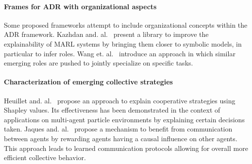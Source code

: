 \documentclass{ecai}
\begin{document}
\paragraph{\textbf{Frames for ADR with organizational aspects}}
%
Some proposed frameworks attempt to include organizational concepts within the ADR framework.
Kazhdan and. al.~\cite{Kazhdan2020} present a library to improve the explainability of MARL systems by bringing them closer to symbolic models, in particular to infer roles.%
%
Wang et. al.~\cite{Wang2020} introduce an approach in which similar emerging roles are pushed to jointly specialize on specific tasks.
%
%

\paragraph{\textbf{Characterization of emerging collective strategies}}
%
Heuillet and. al.~\cite{Heuillet2022} propose an approach to explain cooperative strategies using Shapley values. Its effectiveness has been demonstrated in the context of applications on multi-agent particle environments by explaining certain decisions taken.
%
Jaques and. al.~\cite{Jaques2019} propose a mechanism to benefit from communication between agents by rewarding agents having a causal influence on other agents. This approach leads to learned communication protocols allowing for overall more efficient collective behavior.
\end{document}
